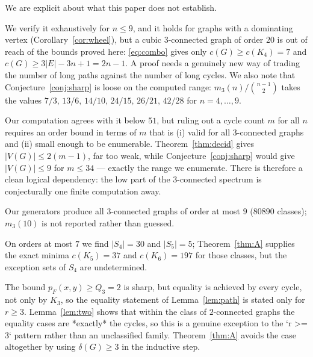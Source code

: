 \documentclass[11pt,a4paper]{article}
\theoremstyle{definition}
\begin{document}
We are explicit about what this paper does not establish.

\begin{description}[leftmargin=0pt,style=nextline]
\item[Conjecture~\ref{conj:sharp} is open.]  We verify it exhaustively for
  $n\le 9$, and it holds for graphs with a dominating vertex
  (Corollary~\ref{cor:wheel}), but a cubic $3$-connected graph of order $20$ is
  out of reach of the bounds proved here: \eqref{eq:combo} gives only
  $c(G)\ge c(K_4)=7$ and $c(G)\ge 3|E|-3n+1=2n-1$.  A proof needs a genuinely
  new way of trading the number of long paths against the number of long
  cycles.  We also note that Conjecture~\ref{conj:sharp} is loose on the
  computed range: $m_3(n)/\binom{n-1}{2}$ takes the values
  $7/3,\,13/6,\,14/10,\,24/15,\,26/21,\,42/28$ for $n=4,\dots,9$.
\item[Conjecture 6(a) of \cite{mcculloch2026} is not settled.]  Our computation
  agrees with it below $51$, but ruling out a cycle count $m$ for all $n$
  requires an order bound in terms of $m$ that is (i) valid for all
  $3$-connected graphs and (ii) small enough to be enumerable.
  Theorem~\ref{thm:decid} gives $|V(G)|\le 2(m-1)$, far too weak, while
  Conjecture~\ref{conj:sharp} would give $|V(G)|\le 9$ for $m\le 34$ --- exactly
  the range we enumerate.  There is therefore a clean logical dependency: the
  low part of the $3$-connected spectrum is conjecturally one finite
  computation away.
\item[$m_3(n)$ is known only for $n\le 9$.]  Our generators produce all
  $3$-connected graphs of order at most $9$ ($80890$ classes); $m_3(10)$ is
  not reported rather than guessed.
\item[The spectra $S_k$ for $k\ge 4$ are only sampled.]  On orders at most $7$
  we find $|S_4|=30$ and $|S_5|=5$; Theorem~\ref{thm:A} supplies the exact
  minima $c(K_5)=37$ and $c(K_6)=197$ for those classes, but the exception sets
  of $S_4$ are undetermined.
\item[Equality in Lemma~\ref{lem:path} for $r=2$.]  The bound
  $p_F(x,y)\ge Q_3=2$ is sharp, but equality is achieved by every cycle, not
  only by $K_3$, so the equality statement of Lemma~\ref{lem:path} is stated
  only for $r\ge3$.  Lemma~\ref{lem:two} shows that within the class of
  $2$-connected graphs the equality cases are *exactly* the cycles, so this is
  a genuine exception to the `r >= 3` pattern rather than an unclassified
  family.  Theorem~\ref{thm:A} avoids the case altogether by using
  $\delta(G)\ge3$ in the inductive step.

\end{description}
\end{document}
